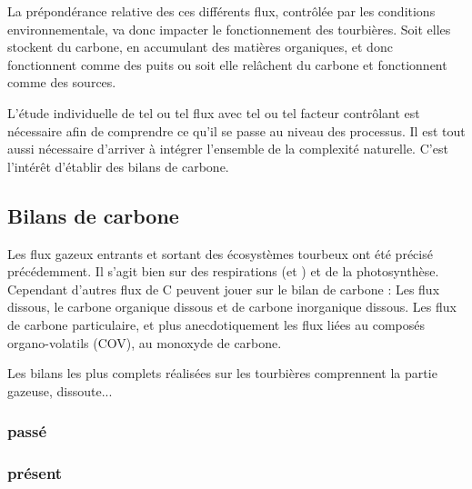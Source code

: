 La prépondérance relative des ces différents flux, contrôlée par les conditions environnementale, va donc impacter le fonctionnement des tourbières. 
Soit elles stockent du carbone, en accumulant des matières organiques, et donc fonctionnent comme des puits ou soit elle relâchent du carbone et fonctionnent comme des sources.


L'étude individuelle de tel ou tel flux avec tel ou tel facteur contrôlant est nécessaire afin de comprendre ce qu'il se passe au niveau des processus. Il est tout aussi nécessaire d'arriver à intégrer l'ensemble de la complexité naturelle.
C'est l'intérêt d'établir des bilans de carbone.

\subsection{Bilans de carbone}

Les flux gazeux entrants et sortant des écosystèmes tourbeux ont été précisé précédemment.
Il s'agit bien sur des respirations (\COO et \CHH) et de la photosynthèse.
Cependant d'autres flux de C peuvent jouer sur le bilan de carbone : 
Les flux dissous, le carbone organique dissous et de carbone inorganique dissous.
Les flux de carbone particulaire, et plus anecdotiquement les flux liées au composés organo-volatils (COV), au monoxyde de carbone.

Les bilans les plus complets réalisées sur les tourbières comprennent la partie gazeuse, dissoute...

\subsubsection{passé}

\subsubsection{présent}











